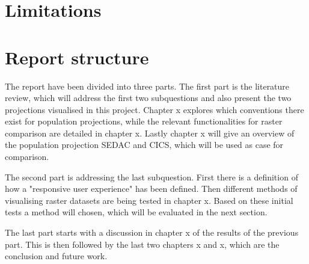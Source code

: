 

\section{Limitations}

\section{Report structure}


The report have been divided into three parts. The first part is the literature review, which will address the first two subquestions and also present the two projections visualised in this project. Chapter x explores which conventions there exist for population projections, while the relevant functionalities for raster comparison are detailed in chapter x. Lastly chapter x will give an overview of the population projection SEDAC and CICS, which will be used as case for comparison.

The second part is addressing the last subquestion. First there is a definition of how a "responsive user experience" has been defined. Then different methods of visualising raster datasets are being tested in chapter x. Based on these initial tests a method will chosen, which will be evaluated in the next section.

The last part starts with a discussion in chapter x of the results of the previous part. This is then followed by the last two chapters x and x, which are the conclusion and future work.  

%
%
